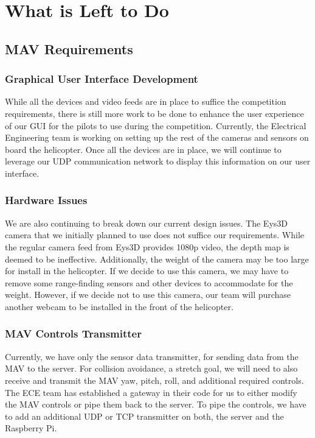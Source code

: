 \documentclass[onecolumn, oneside, letterpaper, draftclsnofoot, 10pt, compsoc]{IEEEtran}
\begin{document}
\section{What is Left to Do}
\subsection{MAV Requirements}

\subsubsection{Graphical User Interface Development}
\noindent
While all the devices and video feeds are in place to suffice the competition requirements, there is still more work to be done to enhance the user experience of our GUI for the pilot\textquotesingle s to use during the competition. Currently, the Electrical Engineering team is working on setting up the rest of the cameras and sensors on board the helicopter. Once all the devices are in place, we will continue to leverage our UDP communication network to display this information on our user interface.

\subsubsection{Hardware Issues}
\noindent
We are also continuing to break down our current design issues. The Eys3D camera that we initially planned to use does not suffice our requirements. While the regular camera feed from Eys3D provides 1080p video, the depth map is deemed to be ineffective. Additionally, the weight of the camera may be too large for install in the helicopter. If we decide to use this camera, we may have to remove some range-finding sensors and other devices to accommodate for the weight. However, if we decide not to use this camera, our team will purchase another webcam to be installed in the front of the helicopter.

\subsubsection{MAV Controls Transmitter}
\noindent
Currently, we have only the sensor data transmitter, for sending data from the MAV to the server. For collision avoidance, a stretch goal, we will need to also receive and transmit the MAV yaw, pitch, roll, and additional required controls. The ECE team has established a gateway in their code for us to either modify the MAV controls or pipe them back to the server. To pipe the controls, we have to add an additional UDP or TCP transmitter on both, the server and the Raspberry Pi.
\end{document}
